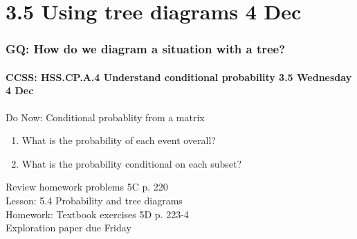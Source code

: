 \documentclass{beamer}
\begin{document}
\section{3.5 Using tree diagrams 4 Dec}
\frame
{
  \frametitle{GQ: How do we diagram a situation with a tree?}
  \framesubtitle{CCSS: HSS.CP.A.4 Understand conditional probability \hfill \alert{3.5 Wednesday 4 Dec}}

  \begin{block}{Do Now: Conditional probablity from a matrix}
  \begin{enumerate}
    \item What is the probability of each event overall?
    \item What is the probability conditional on each subset?
  \end{enumerate}
  \end{block}
  Review homework problems 5C p. 220 \\
  Lesson: 5.4 Probability and tree diagrams \\ \smallskip
  Homework: Textbook exercises 5D p. 223-4 \\
  Exploration paper \alert{due Friday}
}
\end{document}
